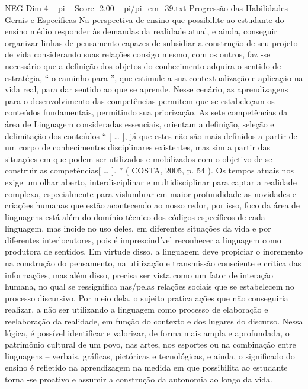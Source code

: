 \begin{textsample}{NEG Dim 4 – pi – Score -2.00 – pi/pi\_em\_39.txt}  \label{ex:f4_neg_165}
Progressão das Habilidades Gerais e Específicas Na perspectiva de ensino que possibilite ao estudante do ensino médio responder às demandas da realidade atual, e ainda, conseguir organizar linhas de pensamento capazes de subsidiar a construção de seu projeto de vida considerando suas relações consigo mesmo, com os outros, faz -se necessário que a definição dos objetos do conhecimento adquira o sentido de estratégia, “ o caminho para ”, que estimule a sua contextualização e aplicação na vida real, para dar sentido ao que se aprende.
Nesse cenário, as aprendizagens para o desenvolvimento das competências permitem que se estabeleçam os conteúdos fundamentais, permitindo sua priorização.
As sete competências da área de Linguagem consideradas essenciais, orientam a definição, seleção e delimitação dos conteúdos “ [ … ], já que estes não são mais definidos a partir de um corpo de conhecimentos disciplinares existentes, mas sim a partir das situações em que podem ser utilizados e mobilizados com o objetivo de se construir as competências[ … ]. ” ( COSTA, 2005, p. 54 ).
Os tempos atuais nos exige um olhar aberto, interdisciplinar e multidisciplinar para captar a realidade complexa, especialmente para vislumbrar em maior profundidade as novidades e criações humanas que estão acontecendo ao nosso redor, por isso, foco da área de linguagens está além do domínio técnico dos códigos específicos de cada linguagem, mas incide no uso deles, em diferentes situações da vida e por diferentes interlocutores, pois é imprescindível reconhecer a linguagem como produtora de sentidos.
Em virtude disso, a linguagem deve propiciar o incremento na construção do pensamento, na utilização e transmissão consciente e crítica das informações, mas além disso, precisa ser vista como um fator de interação humana, no qual se ressignifica nas/pelas relações sociais que se estabelecem no processo discursivo.
Por meio dela, o sujeito pratica ações que não conseguiria realizar, a não ser utilizando a linguagem como processo de elaboração e reelaboração da realidade, em função do contexto e dos lugares do discurso.
Nessa lógica, é possível identificar e valorizar, de forma mais ampla e aprofundada, o patrimônio cultural de um povo, nas artes, nos esportes ou na combinação entre linguagens – verbais, gráficas, pictóricas e tecnológicas, e ainda, o significado do ensino é refletido na aprendizagem na medida em que possibilita ao estudante torna -se proativo e assumir a construção da autonomia ao longo da vida.

\end{textsample}
